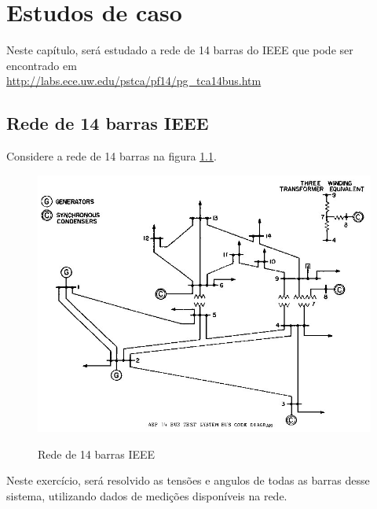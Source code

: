 \chapter{Estudos de caso}
\label{SectionEstudosDeCaso}
Neste capítulo, será estudado a rede de 14 barras do IEEE que pode ser encontrado em \\ \href{http://labs.ece.uw.edu/pstca/pf14/pg_tca14bus.htm}{http://labs.ece.uw.edu/pstca/pf14/pg\_tca14bus.htm}
\section{Rede de 14 barras IEEE}
\label{SectionRedePequena}
Considere a rede de 14 barras na figura \ref{FigRede4barrasLinearizado}.\\
\begin{figure}[!htb]
\caption{Rede de 14 barras IEEE}
 \centering %
\includegraphics[width=12cm]{figuras/14bus.jpg}
\label{FigRede4barrasLinearizado}
\end{figure}
Neste exercício, será resolvido as tensões e angulos de todas as barras desse sistema, utilizando dados de medições disponíveis na rede. 
